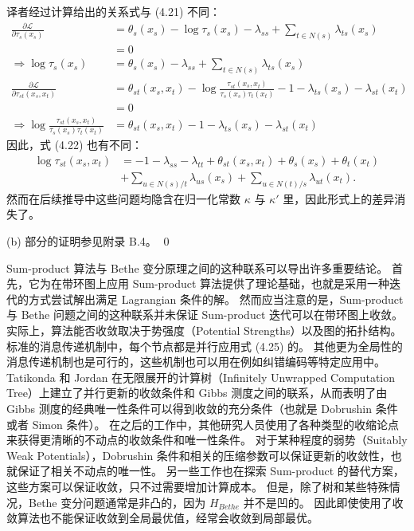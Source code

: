 \begin{note}
    译者经过计算给出的关系式与 (4.21) 不同：
    \begin{align*}
        \frac{\partial \mathcal{L}}{\partial \tau_s(x_s)} &= \theta_s(x_s) - \log\tau_s(x_s) - \lambda_{ss} + \sum_{t \in N(s)}\lambda_{ts}(x_s) \\
        &= 0 \\
        \Rightarrow \log\tau_{s}(x_s) &= \theta_s(x_s) - \lambda_{ss} + \sum_{t \in N(s)}\lambda_{ts}(x_s) \\
        \frac{\partial \mathcal{L}}{\partial \tau_{st}(x_s, x_t)} &= \theta_{st}(x_s, x_t) - \log\frac{\tau_{st}(x_s, x_t)}{\tau_s(x_s)\tau_t(x_t)} - 1 - \lambda_{ts}(x_s) - \lambda_{st}(x_t) \\
        &= 0 \\
        \Rightarrow \log\frac{\tau_{st}(x_s, x_t)}{\tau_s(x_s)\tau_t(x_t)} &= \theta_{st}(x_s, x_t) -1 - \lambda_{ts}(x_s) - \lambda_{st}(x_t)
    \end{align*}
    因此，式 (4.22) 也有不同：
    \begin{align*}
        \log\tau_{st}(x_s, x_t) &= -1 - \lambda_{ss} - \lambda_{tt} + \theta_{st}(x_s, x_t) + \theta_s(x_s) + \theta_t(x_t) \\
        & + \sum_{u \in N(s)/t}\lambda_{us}(x_s) + \sum_{u \in N(t)/s}\lambda_{ut}(x_t).
    \end{align*}
    然而在后续推导中这些问题均隐含在归一化常数 $\kappa$ 与 $\kappa'$ 里，因此形式上的差异消失了。
\end{note}

(b) 部分的证明参见附录 B.4。
\qed

Sum-product 算法与 Bethe 变分原理之间的这种联系可以导出许多重要结论。
首先，它为在带环图上应用 Sum-product 算法提供了理论基础，也就是采用一种迭代的方式尝试解出满足 Lagrangian 条件的解。
然而应当注意的是，Sum-product 与 Bethe 问题之间的这种联系并未保证 Sum-product 迭代可以在带环图上收敛。
实际上，算法能否收敛取决于势强度（Potential Strengths）以及图的拓扑结构。
标准的消息传递机制中，每个节点都是并行应用式 (4.25) 的。
其他更为全局性的消息传递机制也是可行的，这些机制也可以用在例如纠错编码等特定应用中。
Tatikonda 和 Jordan 在无限展开的计算树（Infinitely Unwrapped Computation Tree）上建立了并行更新的收敛条件和 Gibbs 测度之间的联系，从而表明了由 Gibbs 测度的经典唯一性条件可以得到收敛的充分条件（也就是 Dobrushin 条件或者 Simon 条件）。
在之后的工作中，其他研究人员使用了各种类型的收缩论点来获得更清晰的不动点的收敛条件和唯一性条件。
对于某种程度的弱势（Suitably Weak Potentials），Dobrushin 条件和相关的压缩参数可以保证更新的收敛性，也就保证了相关不动点的唯一性。
另一些工作也在探索 Sum-product 的替代方案，这些方案可以保证收敛，只不过需要增加计算成本。
但是，除了树和某些特殊情况，Bethe 变分问题通常是非凸的，因为 $H_{Bethe}$ 并不是凹的。
因此即使使用了收敛算法也不能保证收敛到全局最优值，经常会收敛到局部最优。

